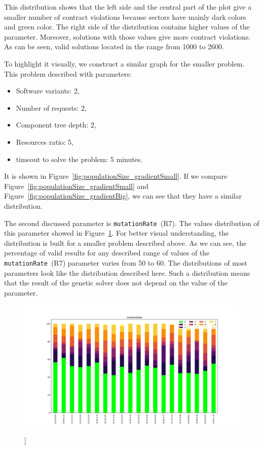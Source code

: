 This distribution shows that the left side and the central part of the plot give a smaller number of contract violations because sectors have mainly dark colors and green color. The right side of the distribution contains higher values of the parameter. Moreover, solutions with those values give more contract violations. As can be seen, valid solutions located in the range from 1000 to 2600.

To highlight it visually, we construct a similar graph for the smaller problem. This problem described with parameters:
\begin{itemize}
	\item Software variants: 2,
	\item Number of requests: 2,
	\item Component tree depth: 2,
	\item Resources ratio: 5,
	\item timeout to solve the problem: 5 minutes.
\end{itemize}

It is shown in Figure~\ref{fig:populationSize_gradientSmall}. If we compare Figure~\ref{fig:populationSize_gradientSmall} and Figure~\ref{fig:populationSize_gradientBig}, we can see that they have a similar distribution.

The second  discussed parameter is \texttt{mutationRate}~(R7). The values distribution of this parameter showed in Figure~\ref{fig:mutationRate_gradient}. For better visual understanding, the distribution is built for a smaller problem described above. 
As we can see, the percentage of valid results for any described range of values of the \texttt{mutationRate}~(R7) parameter varies from 50 to 60. The distributions of most parameters look like the distribution described here. Such a distribution means that the result of the genetic solver does not depend on the value of the parameter. 

\begin{figure}
	\centering
	\includegraphics[width=\textwidth]{images/mutationRate_gradient_500dpi.png}
	\caption[]]{}
	\label{fig:mutationRate_gradient}
\end{figure}

